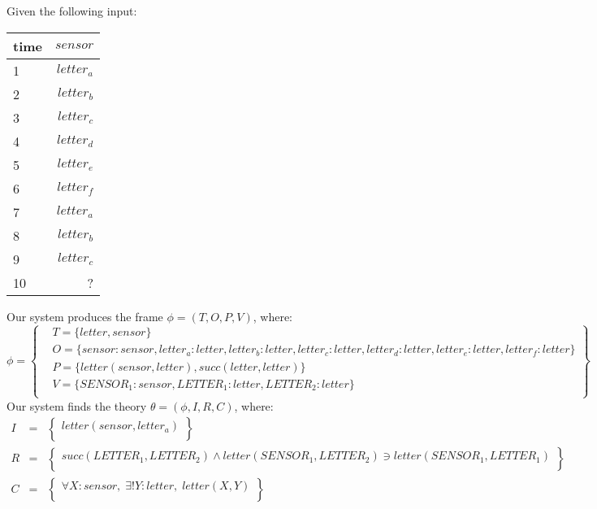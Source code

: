 
Given the following input:
\begin{table}[ht!]
\begin{center}
\begin{tabular}{|l|r|}
\hline
time & $\mathit{sensor}$\\
\hline
1 & $\mathit{letter}_a$ \\
2 & $\mathit{letter}_b$ \\
3 & $\mathit{letter}_c$ \\
4 & $\mathit{letter}_d$ \\
5 & $\mathit{letter}_e$ \\
6 & $\mathit{letter}_f$ \\
7 & $\mathit{letter}_a$ \\
8 & $\mathit{letter}_b$ \\
9 & $\mathit{letter}_c$ \\
10 & ? \\
\hline
\end{tabular}
\end{center}
\end{table}

Our system produces the frame $\phi = (T, O, P, V)$, where:
\begin{equation*}
\phi = \left \{
\begin{aligned}
& T = \{ 
letter,sensor
\}\\
& O = \{
\mathit{sensor}: sensor,\mathit{letter}_a: letter,\mathit{letter}_b: letter,\mathit{letter}_c: letter,\mathit{letter}_d: letter,\mathit{letter}_e: letter,\mathit{letter}_f: letter
\}\\
& P = \{
\mathit{letter}(sensor, letter),\mathit{succ}(letter, letter)
\}\\
& V = \{
SENSOR_1: sensor,LETTER_1: letter,LETTER_2: letter
\}\\
\end{aligned}\right\}
\end{equation*}
Our system finds the theory $\theta = (\phi, I, R, C)$, where:
\begin{eqnarray*}
I & = & \left\{ \begin{array}{l}
\mathit{letter}(\mathit{sensor},\mathit{letter}_a)\\
\end{array}\right\}\\
R & = &  \left\{ \begin{array}{l}
\mathit{succ}(\mathit{LETTER}_1,\mathit{LETTER}_2) \wedge \mathit{letter}(\mathit{SENSOR}_1,\mathit{LETTER}_2) \ni \mathit{letter}(\mathit{SENSOR}_1,\mathit{LETTER}_1)\\
\end{array}\right\}\\
C & = & \left\{ \begin{array}{l}
\forall X : sensor, \; \exists ! Y : letter, \; letter(X, Y) \\
\end{array}\right\}\\
\end{eqnarray*}

